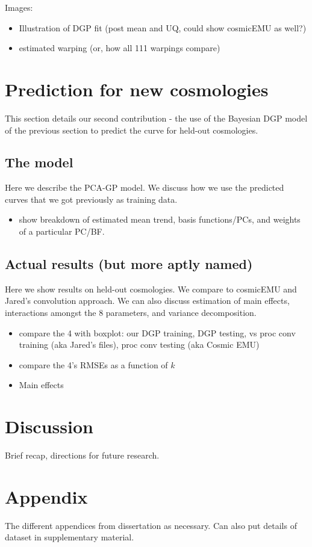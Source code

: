 \documentclass[11pt]{article}
\begin{document}
Images:
\begin{itemize}
    \item Illustration of DGP fit (post mean and UQ, could show cosmicEMU as well?)
    \item estimated warping (or, how all 111 warpings compare)
\end{itemize}


\section{Prediction for new cosmologies}

This section details our second contribution - the use of the Bayesian DGP model of the previous section to predict the curve for held-out cosmologies.

\subsection{The model}

Here we describe the PCA-GP model.  We discuss how we use the predicted curves that we got previously as training data.

\begin{itemize}
    \item show breakdown of estimated mean trend, basis functions/PCs, and weights of a particular PC/BF.
\end{itemize}

\subsection{Actual results (but more aptly named)}

Here we show results on held-out cosmologies.  We compare to cosmicEMU and Jared's convolution approach. We can also discuss estimation of main effects, interactions amongst the 8 parameters, and variance decomposition.

\begin{itemize}
    \item compare the 4 with boxplot: our DGP training, DGP testing, vs proc conv training (aka Jared's files), proc conv testing (aka Cosmic EMU)
    \item compare the 4's RMSEs as a function of $k$
    \item Main effects
\end{itemize}

\section{Discussion}

Brief recap, directions for future research.

\section{Appendix}

The different appendices from dissertation as necessary. Can also put details of dataset in supplementary material.



\end{document}
